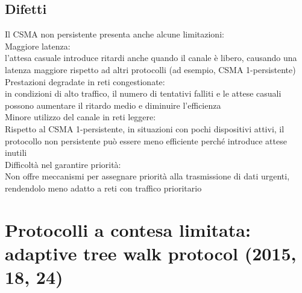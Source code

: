 \documentclass[10pt,oneside,a4paper]{article}
\begin{document}
\subsection{Difetti}
Il CSMA non persistente presenta anche alcune limitazioni:\\
Maggiore latenza:\\
l’attesa casuale introduce ritardi anche quando il canale è libero, causando una latenza maggiore rispetto ad altri protocolli (ad esempio, CSMA 1-persistente)\\
Prestazioni degradate in reti congestionate:\\
in condizioni di alto traffico, il numero di tentativi falliti e le attese casuali possono aumentare il ritardo medio e diminuire l'efficienza\\
Minore utilizzo del canale in reti leggere:\\
Rispetto al CSMA 1-persistente, in situazioni con pochi dispositivi attivi, il protocollo non persistente può essere meno efficiente perché introduce attese inutili\\
Difficoltà nel garantire priorità:\\
Non offre meccanismi per assegnare priorità alla trasmissione di dati urgenti, rendendolo meno adatto a reti con traffico prioritario
\section{Protocolli a contesa limitata: adaptive tree walk protocol (2015, 18, 24)}
\end{document}
